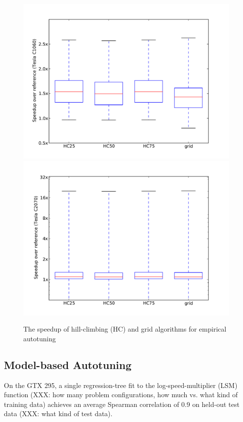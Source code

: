 \documentclass{sig-alternate}
\begin{document}
\begin{figure}
\centering
\includegraphics[scale=.42]{fig_genX_munctional0_1060.pdf}
\includegraphics[scale=.42]{fig_genX_munctional0_2070.pdf}
\caption{The speedup of hill-climbing (HC) and grid algorithms for empirical autotuning}
\label{fig:speedup}
\end{figure}

\subsection{Model-based Autotuning}

On the GTX 295, a single regression-tree fit to the log-speed-multiplier
(LSM) function (XXX: how many problem configurations, how much vs. what
kind of training data) achieves an average Spearman correlation of 0.9 on
held-out test data (XXX: what kind of test data).
\end{document}
